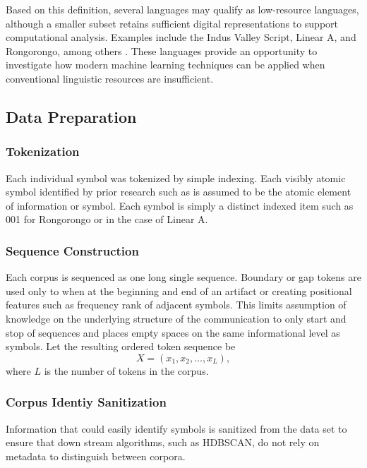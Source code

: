 \documentclass[preprint,12pt]{elsarticle}
\begin{document}
Based on this definition, several languages may qualify as low-resource languages, although a smaller subset retains sufficient digital representations to support computational analysis. Examples include the Indus Valley Script, Linear A, and Rongorongo, among others \cite{yadav2010_indus_ngrams,salgarella2021_sigla,fischer1997rongorongo}. These languages provide an opportunity to investigate how modern machine learning techniques can be applied when conventional linguistic resources are insufficient.


\subsection{Data Preparation}
\subsubsection{Tokenization}
Each individual symbol was tokenized by simple indexing. Each visibly atomic symbol identified by prior research such as \cite{barthel1958grundlagen} \cite{salgarella2021_sigla} \cite{yadav2010_indus_ngrams} is assumed to be the atomic element of information or symbol. Each symbol is simply a distinct indexed item such as 001 for Rongorongo or \LinearAII{} in the case of Linear A. 

\subsubsection{Sequence Construction}
Each corpus is sequenced as one long single sequence. Boundary or gap tokens are used only to when at the beginning and end of an artifact or creating positional features such as frequency rank of adjacent symbols. This limits assumption of knowledge on the underlying structure of the communication to only start and stop of sequences and places empty spaces on the same informational level as symbols.
Let the resulting ordered token sequence be
\[
X = (x_1,x_2,\ldots,x_L),
\]where \(L\) is the number of tokens in the corpus.

\subsubsection{Corpus Identiy Sanitization} 

Information that could easily identify symbols is sanitized from the data set to ensure that down stream algorithms, such as HDBSCAN, do not rely on metadata to distinguish between corpora. 
\end{document}
